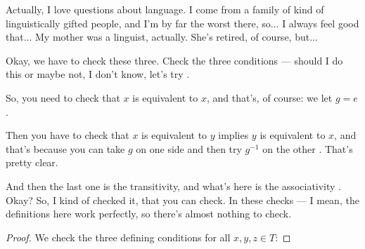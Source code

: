 \begin{hidden}
\end{hidden}

\begin{speech}[00:11:11 - 00:11:29]
Actually, I love questions about language. I come from a family of kind of linguistically gifted people, and I'm by far the worst there, so... I always feel good that... My mother was a linguist, actually. She's retired, of course, but...
\end{speech}

\begin{proofWrapper}
\begin{speech}[00:11:29 - 00:12:22]
Okay, we have to check these three. Check the three conditions --- should I do this or maybe not, I don't know, let's try .

So, you need to check that $x$ is equivalent to $x$, and that's, of course: we let $g = e$ .

Then you have to check that $x$ is equivalent to $y$ implies $y$ is equivalent to $x$, and that's because you can take $g$ on one side and then try $g^{-1}$ on the other . That's pretty clear.

And then the last one is the transitivity, and what's here is the associativity . Okay? So, I kind of checked it, that you can check. In these checks --- I mean, the definitions here work perfectly, so there's almost nothing to check.
\end{speech}

\begin{content}

\begin{proof}
We check the three defining conditions for all $x, y, z \in T$:


\end{proof}
\end{content}
\end{proofWrapper}
